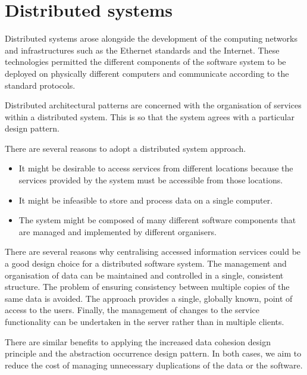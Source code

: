 \documentclass[a4paper, openany]{memoir}
\begin{document}
\section{Distributed systems}
Distributed systems arose alongside the development of the computing networks and infrastructures such as the Ethernet standards and the Internet. These technologies permitted the different components of the software system to be deployed on physically different computers and communicate according to the standard protocols.

Distributed architectural patterns are concerned with the organisation of services within a distributed system. This is so that the system agrees with a particular design pattern. 

There are several reasons to adopt a distributed system approach.
\begin{itemize}
    \item It might be desirable to access services from different locations because the services provided by the system must be accessible from those locations.
    \item It might be infeasible to store and process data on a single computer.
    \item The system might be composed of many different software components that are managed and implemented by different organisers.
\end{itemize}

There are several reasons why centralising accessed information services could be a good design choice for a distributed software system. The management and organisation of data can be maintained and controlled in a single, consistent structure. The problem of ensuring consistency between multiple copies of the same data is avoided. The approach provides a single, globally known, point of access to the users. Finally, the management of changes to the service functionality can be undertaken in the server rather than in multiple clients.

There are similar benefits to applying the increased data cohesion design principle and the abstraction occurrence design pattern. In both cases, we aim to reduce the cost of managing unnecessary duplications of the data or the software.
\end{document}
